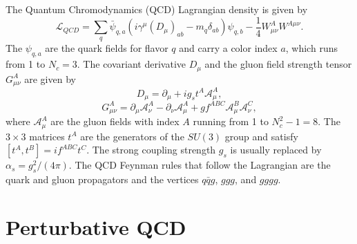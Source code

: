 The Quantum Chromodynamics (QCD) Lagrangian density is given by
%
\begin{equation}
\mathcal{L}_{QCD} =  \sum_q \bar{\psi}_{q,a} (i\gamma^{\mu} (D_{\mu})_{ab} - m_q \delta_{ab})\psi_{q,b} - \frac{1}{4} W^A_{\mu\nu}W^{A\mu\nu}. 
\end{equation}
%
The $\psi_{q,a}$ are the quark fields for flavor $q$ and carry a color index $a$, which runs from 1 to $N_c = 3$. The covariant derivative $D_{\mu}$ and the gluon field strength tensor $G^A_{\mu\nu}$ are given by
%
\begin{equation}
D_{\mu} = \partial_{\mu} + i g_s t^A \mathcal{A}^A_{\mu},
\end{equation}
%
\begin{equation}
G^A_{\mu\nu} = \partial_{\mu} \mathcal{A}^A_{\nu} - \partial_{\nu} \mathcal{A}^A_{\mu} + g f^{ABC} \mathcal{A}^B_{\mu} \mathcal{A}^C_{\nu},
\end{equation}
%
where $\mathcal{A}^A_{\mu}$ are the gluon fields with index $A$ running from 1 to $N^2_c - 1 = 8$. The $3 \times 3 $ matrices $t^A$ are the generators of the $SU(3)$ group and satisfy $[t^A,t^B]= if^{ABC} t^C$. The strong coupling strength $g_s$ is usually replaced by $\alpha_s = g^2_s/(4\pi)$. The QCD Feynman rules that follow the Lagrangian are the quark and gluon propagators and the vertices $q\bar{q}g$, $ggg$, and $gggg$.




\section{Perturbative QCD}\label{sec:qcd}


